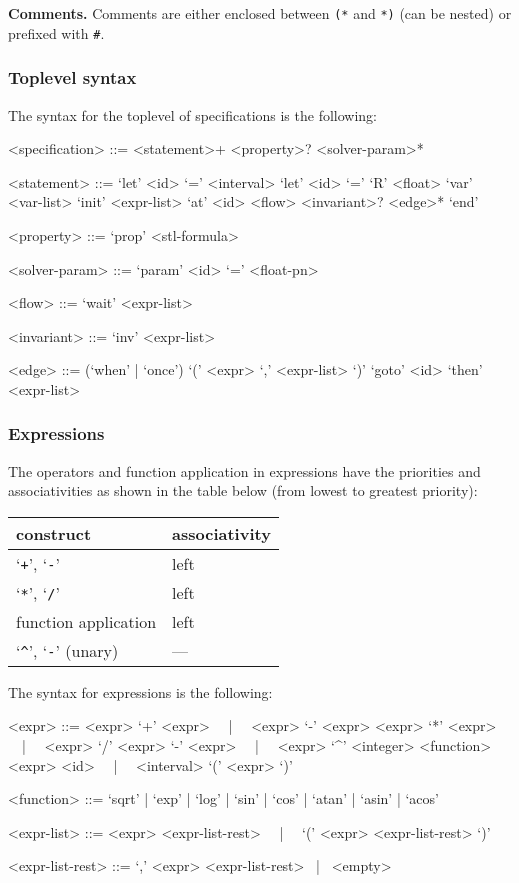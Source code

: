 \documentclass[12pt,a4paper]{article}
\begin{document}
\noindent
\textbf{Comments.}
Comments are either enclosed between \texttt{(*} and \texttt{*)} (can be nested) or prefixed with \texttt{\#}.


\subsubsection{Toplevel syntax}

The syntax for the toplevel of specifications is the following:
\begin{grammar}
<specification> ::= <statement>+ <property>? <solver-param>*

<statement> ::= 
`let' <id> `=' <interval>
\alt `let' <id> `=' `R' <float>
\alt `var' <var-list>
\alt `init' <expr-list>
\alt `at' <id> <flow> <invariant>? <edge>* `end'

<property> ::= `prop' <stl-formula>

<solver-param> ::= `param' <id> `=' <float-pn>


<flow> ::= `wait' <expr-list>

<invariant> ::= `inv' <expr-list>

<edge> ::= (`when' | `once') `(' <expr> `,' <expr-list> `)' `goto' <id> `then' <expr-list>
\end{grammar}


\subsubsection{Expressions}

The operators and function application in expressions have the priorities and associativities as shown in the table below (from lowest to greatest priority):
\begin{table}[ht]
	\centering
    \begin{tabular}{|l|l|} \hline
		construct & associativity \\
		\hline
		`\texttt{+}', `\texttt{-}' & left \\
		`\texttt{*}', `\texttt{/}' & left \\
		function application & left \\
		`\texttt{\^}', `\texttt{-}' (unary) & --- \\
		\hline
	\end{tabular}
\end{table}

The syntax for expressions is the following:
\begin{grammar}
<expr> ::= <expr> `+' <expr> ~~|~~ <expr> `-' <expr>
\alt <expr> `*' <expr> ~~|~~ <expr> `/' <expr>
\alt `-' <expr> ~~|~~ <expr> `^' <integer>
\alt <function> <expr>
\alt <id> ~~|~~ <interval>
\alt `(' <expr> `)' 

<function> ::= `sqrt' | `exp' | `log' | `sin' | `cos' | `atan' | `asin' | `acos'

<expr-list> ::= <expr> <expr-list-rest> ~~|~~ `(' <expr> <expr-list-rest> `)'

<expr-list-rest> ::= `,' <expr> <expr-list-rest> ~|~ <empty>
\end{grammar}
\end{document}
